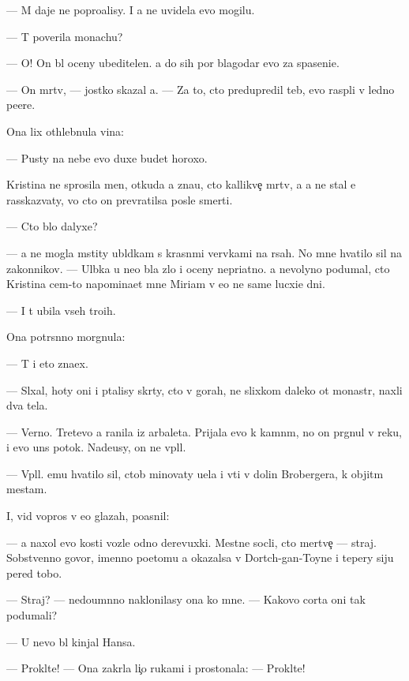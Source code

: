 \documentclass[10pt]{book}
\begin{document}
— M{\yi} daje ne popro{\x}alisy. I {\y}a ne uvidela {\y}evo mogilu.

— T{\yi} poverila monachu?

— O! On b{\yi}l oceny ubeditelen. {\Y}a do sih por blagodar{\io} {\y}evo za spaseni{\y}e.

— On m{\e}rtv, — jostko skazal {\y}a. — Za to, cto predupredil teb{\ia}, {\y}evo rasp{\ia}li v led{\ia}no{\y} pe{\x}ere.

Ona lix othlebnula vina:

— Pusty na nebe {\y}evo duxe budet horoxo.

Kristina ne sprosila men{\ia}, otkuda {\y}a zna{\y}u, cto kallikve{\c} m{\e}rtv, a {\y}a ne stal {\y}e{\y} rasskaz{\yi}vaty, vo cto on prevratilsa posle smerti.

— Cto b{\yi}lo dalyxe?

— {\Y}a ne mogla mstity ubl{\io}dkam s krasn{\yi}mi ver{\e}vkami na r{\ia}sah. No mne hvatilo sil na zakonnikov. — Ul{\yi}bka u ne{\y}o b{\yi}la zlo{\y} i oceny nepri{\y}atno{\y}. {\Y}a nevolyno podumal, cto Kristina cem-to napomina{\y}et mne Mi\-ri\-am v {\y}e{\y}o ne sam{\yi}{\y}e lucxi{\y}e dni.

— I t{\yi} ubila vseh tro{\y}ih.

Ona potr{\ia}s{\e}nno morgnula:

— T{\yi} i eto zna\-{\y}ex.

— Sl{\yi}xal, hoty oni i p{\yi}talisy skr{\yi}\-ty, cto v gorah, ne slixkom daleko ot monast{\yi}r{\ia}, naxli dva tela.

— Verno. Tret{\y}evo {\y}a ranila iz arbaleta. Prijala {\y}evo k kamn{\ia}m, no on pr{\yi}gnul v reku, i {\y}evo un{\e}s potok. Nade{\y}usy, on ne v{\yi}pl{\yi}l.

— V{\yi}pl{\yi}l. {\Y}emu hvatilo sil, ctob{\yi} minovaty u{\x}el{\y}a i v{\yi}{\y}ti v dolin{\yi} Brobergera, k objit{\yi}m mestam.

I, vid{\ia} vopros v {\y}e{\y}o glazah, po{\y}asnil:

— {\Y}a naxol {\y}evo kosti voz\-le odno{\y} derevuxki. Mestn{\yi}{\y}e socli, cto mertve{\c} — straj. Sobstvenno go\-vo\-r{\ia}, imenno poetomu {\y}a okazalsa v Dortch-gan-Toyne i tepery siju pered tobo{\y}.

— Straj? — nedoum{\e}nno naklonilasy ona ko mne. — Kakovo corta oni tak podumali?

— U nevo b{\yi}l kinjal Hansa.

— Prokl{\ia}t{\y}e! — Ona zakr{\yi}la li{\c}o rukami i prostonala: — Prokl{\ia}t{\y}e!
\end{document}
